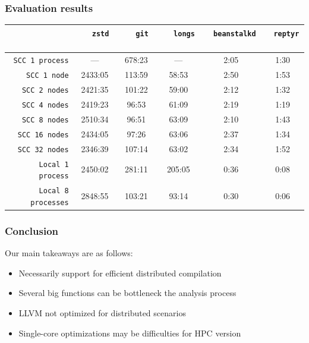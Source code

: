 \begin{frame}
\frametitle{Evaluation results}
\begin{table}[tbh]
\centering
\label{table:projects}
\begin{adjustbox}{width=110mm}
\begin{tabular}{|r|c|c|c|c|c|}
\hline
\           & $\quad$    \texttt{zstd}       $\quad$
            & $\quad$    \texttt{git}        $\quad$
            & $\quad$    \texttt{longs}      $\quad$
            & $\enspace$ \texttt{beanstalkd} $\enspace$
            & $\enspace$ \texttt{reptyr}     $\enspace$ \\ \hline

\texttt{SCC 1 process}
& ---     & 678:23   & ---    & 2:05 & 1:30 \\ \hline
\texttt{SCC 1 node}
& 2433:05 & 113:59   & 58:53  & 2:50 & 1:53 \\ \hline
\texttt{SCC 2 nodes}
& 2421:35 & 101:22   & 59:00  & 2:12 & 1:32 \\ \hline
\texttt{SCC 4 nodes}
& 2419:23 & 96:53    & 61:09  & 2:19 & 1:19 \\ \hline
\texttt{SCC 8 nodes}
& 2510:34 & 96:51    & 63:09  & 2:10 & 1:43 \\ \hline
\texttt{SCC 16 nodes}
& 2434:05 & 97:26    & 63:06  & 2:37 & 1:34 \\ \hline
\texttt{SCC 32 nodes}
& 2346:39 & 107:14   & 63:02  & 2:34 & 1:52 \\ \hline \hline
\texttt{Local 1 process}
& 2450:02 & 281:11   & 205:05 & 0:36 & 0:08 \\ \hline
\texttt{Local 8 processes}
& 2848:55 & 103:21   & 93:14  & 0:30 & 0:06 \\ \hline
\end{tabular}
\end{adjustbox}
\end{table}
\end{frame}


\begin{frame}
\frametitle{Conclusion}
Our main takeaways are as follows:
	\begin{itemize}
		\item Necessarily support for efficient distributed compilation
		\item Several big functions can be bottleneck the analysis process
		\item LLVM not optimized for distributed scenarios
		\item Single-core optimizations may be difficulties for HPC version
	\end{itemize}
\end{frame}

